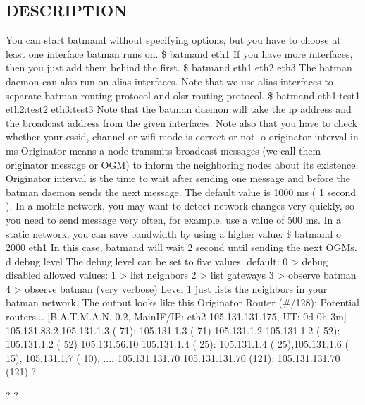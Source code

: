 \documentclass[
	12pt,
	a4paper,
	twoside,
	english,
	headsepline,
	footnosepline,
	automark,
	normalheadings,
	openany,
	cleardoubleplain,
	abstracton,
	idxtotoc,
	liststotoc,
	bibtotoc,
 	BCOR8mm,
]{scrartcl}
\begin{document}
\subsection{DESCRIPTION}
You can start batmand without specifying options, but you have to choose at least one  interface batman runs on. \$ batmand eth1 If you have more interfaces, then you just add them behind the first. \$ batmand eth1 eth2 eth3 The batman daemon can also run on alias interfaces. Note that we use alias interfaces to separate batman routing protocol and olsr routing  protocol. \$ batmand eth1:test1 eth2:test2 eth3:test3 Note that the batman daemon will take the ip address and the broadcast address from the  given interfaces. Note also that you have to check whether your essid, channel or wifi mode is correct or not.
 o originator interval in ms Originator means a node transmits broadcast messages (we call them originator message or  OGM) to inform the neighboring nodes about its existence. Originator interval is the time to wait after sending one message and before the batman  daemon sends the next message. The default value is 1000 ms ( 1 second ). In a mobile network, you may want to detect network changes very quickly, so you need to  send message very often, for example, use a value of 500 ms. In a static network, you can save bandwidth by using a higher value. \$ batmand  o 2000 eth1 In this case, batmand will wait 2 second until sending the next OGMs.  d debug level The debug level can be set to five values.           default:   0  > debug disabled           allowed values:   1  > list neighbors                               2  > list gateways                               3  > observe batman                               4  > observe batman (very verbose) Level 1 just lists the neighbors in your batman network. The output looks like this Originator           Router (\#/128):    Potential routers... [B.A.T.M.A.N. 0.2, MainIF/IP:   eth2 105.131.131.175, UT: 0d 0h 3m] 105.131.83.2        105.131.1.3 (  71):     105.131.1.3 (  71) 105.131.1.2         105.131.1.2 (  52):     105.131.1.2 (  52) 105.131.56.10     105.131.1.4 (  25):   105.131.1.4 (  25),105.131.1.6 ( 15), 105.131.1.7 ( 10),   .... 105.131.131.70   105.131.131.70 (121):  105.131.131.70 (121)
?

? ?
\end{document}
